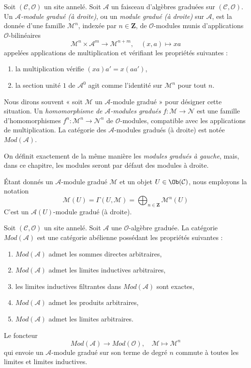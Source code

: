 \begin{definition}
\label{definition-gm} Soit
$(\mathcal{C}, \mathcal{O})$ un site annelé. Soit
$\mathcal{A}$ un faisceau d'algèbres graduées sur
$(\mathcal{C}, \mathcal{O})$. Un
{\it $\mathcal{A}$-module gradué (à droite)}, ou un
{\it module gradué (à droite)} sur $\mathcal{A}$, est la
donnée d'une famille $\mathcal{M}^n$, indexée par $n \in \mathbf{Z}$,
de $\mathcal{O}$-modules munis d'applications
$\mathcal{O}$-bilinéaires
$$
\mathcal{M}^n \times \mathcal{A}^m \to \mathcal{M}^{n + m},\quad (x,
a) \longmapsto xa
$$
appelées applications de multiplication et vérifiant les propriétés
suivantes : \begin{enumerate}
\item la multiplication vérifie $(xa)a' = x(aa')$,
\item la section unité $1$ de $\mathcal{A}^0$
agit comme l'identité sur $\mathcal{M}^n$ pour tout $n$.
\end{enumerate}
Nous dirons souvent « soit $\mathcal{M}$ un $\mathcal{A}$-module gradué »
pour désigner cette situation.
Un {\it homomorphisme de $\mathcal{A}$-modules gradués}
$f : \mathcal{M} \to \mathcal{N}$ est une famille d'homomorphismes
$f^n : \mathcal{M}^n \to \mathcal{N}^n$
de $\mathcal{O}$-modules, compatible avec les applications de multiplication.
La catégorie des $\mathcal{A}$-modules gradués (à
droite) est notée $\textit{Mod}(\mathcal{A})$.
\end{definition}

\noindent On
définit exactement de la même manière les {\it modules gradués à gauche}, mais, dans
ce chapitre, les modules seront par défaut des modules à droite.

\medskip\noindent
Étant donnés un $\mathcal{A}$-module gradué $\mathcal{M}$
et un objet $U \in \Ob(\mathcal{C})$, nous employons la
notation $$
\mathcal{M}(U)
= \Gamma(U, \mathcal{M})
= \bigoplus\nolimits_{n \in \mathbf{Z}} \mathcal{M}^n(U)
$$
C'est un $\mathcal{A}(U)$-module gradué (à droite).

\begin{lemma}
\label{lemma-gm-abelian} Soit
$(\mathcal{C}, \mathcal{O})$ un site annelé. Soit
$\mathcal{A}$ une $\mathcal{O}$-algèbre graduée. La catégorie
$\textit{Mod}(\mathcal{A})$ est une catégorie abélienne possédant les
propriétés suivantes :
\begin{enumerate}
\item $\textit{Mod}(\mathcal{A})$ admet les sommes directes arbitraires,
\item $\textit{Mod}(\mathcal{A})$ admet les limites inductives arbitraires,
\item les limites inductives filtrantes dans $\textit{Mod}(\mathcal{A})$ sont exactes,
\item $\textit{Mod}(\mathcal{A})$ admet les produits arbitraires,
\item $\textit{Mod}(\mathcal{A})$ admet les limites arbitraires.
\end{enumerate}
Le foncteur
$$
\textit{Mod}(\mathcal{A}) \longrightarrow \textit{Mod}(\mathcal{O}),\quad
\mathcal{M} \longmapsto \mathcal{M}^n
$$ qui
envoie un $\mathcal{A}$-module gradué sur son terme de degré $n$ commute à
toutes les limites et limites inductives.
\end{lemma}

